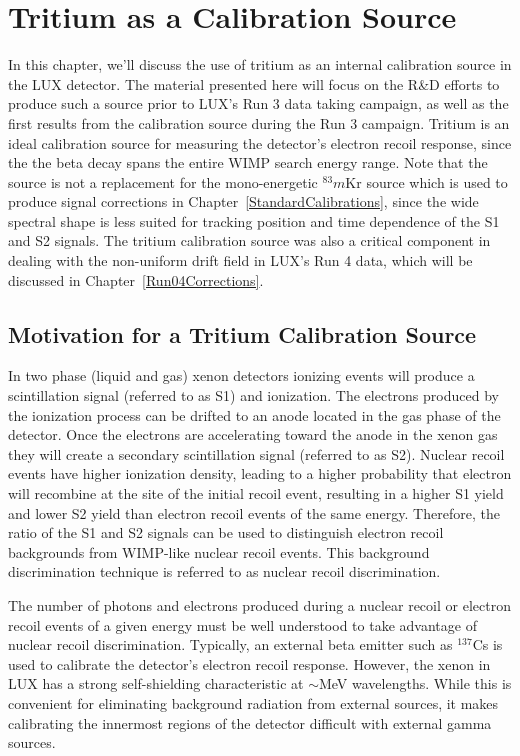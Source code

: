 \section{Tritium as a Calibration Source} \label{TritiumChapter}


In this chapter, we'll discuss the use of tritium as an internal calibration source in the LUX detector.  The material presented here will focus on the R\&D efforts to produce such a source prior to LUX's Run 3 data taking campaign, as well as the first results from the calibration source during the Run 3 campaign.  Tritium is an ideal calibration source for measuring the detector's electron recoil response, since the the beta decay spans the entire WIMP search energy range.  Note that the source is not a replacement for the mono-energetic $^83m$Kr source which is used to produce signal corrections in Chapter~\ref{StandardCalibrations}, since the wide spectral shape is less suited for tracking position and time dependence of the S1 and S2 signals.  The tritium calibration source was also a critical component in dealing with the non-uniform drift field in LUX's Run 4 data, which will be discussed in Chapter~\ref{Run04Corrections}.

\subsection{Motivation for a Tritium Calibration Source}

In two phase (liquid and gas) xenon detectors ionizing events will produce a scintillation signal (referred to as S1) and ionization. The electrons produced by the ionization process can be drifted to an anode located in the gas phase of the detector. Once the electrons are accelerating toward the anode in the xenon gas they will create a secondary scintillation signal (referred to as S2). Nuclear recoil events have higher ionization density, leading to a higher probability that electron will recombine at the site of the initial recoil event, resulting in a higher S1 yield and lower S2 yield than electron recoil events of the same energy. Therefore, the ratio of the S1 and S2 signals can be used to distinguish electron recoil backgrounds from WIMP-like nuclear recoil events.  This background discrimination technique is referred to as nuclear recoil discrimination.

The number of photons and electrons produced during a nuclear recoil or electron recoil events of a given energy must be well understood to take advantage of nuclear recoil discrimination.  Typically, an external beta emitter such as $^{137}$Cs is used to calibrate the detector's electron recoil response. However, the xenon in LUX has a strong self-shielding characteristic at $\sim$MeV wavelengths. While this is convenient for eliminating background radiation from external sources, it makes calibrating the innermost regions of the detector difficult with external gamma sources.

